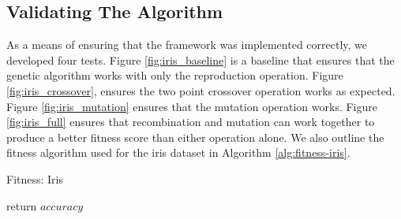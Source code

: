 \documentclass[12pt, final]{dalcsthesis}
\begin{document}
\subsection{Validating The Algorithm}
As a means of ensuring that the framework was implemented correctly, we developed four tests.
Figure \ref{fig:iris_baseline} is a baseline that ensures that the genetic algorithm works with only the reproduction operation.
Figure \ref{fig:iris_crossover}, ensures the two point crossover operation works as expected.
Figure \ref{fig:iris_mutation} ensures that the mutation operation works.
Figure \ref{fig:iris_full} ensures that recombination and mutation can work together to produce a better fitness score than either operation alone.
We also outline the fitness algorithm used for the iris dataset in Algorithm \ref{alg:fitness-iris}.
\begin{algorithm}[!htb]
	\caption{Fitness: Iris}
	\label{alg:fitness-iris}
	\begin{algorithmic}[1]
		\EndIf
		\EndFor
		\State return $accuracy$
	\end{algorithmic}
\end{algorithm}
\end{document}
